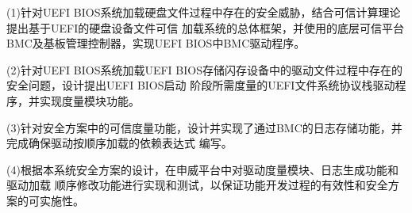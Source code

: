 \begin{cabstract}
\par (1)针对UEFI BIOS系统加载硬盘文件过程中存在的安全威胁，结合可信计算理论提出基于UEFI的硬盘设备文件可信
加载系统的总体框架，并使用的底层可信平台BMC及基板管理控制器，实现UEFI BIOS中BMC驱动程序。
\par (2)针对UEFI BIOS系统加载UEFI BIOS存储闪存设备中的驱动文件过程中存在的安全问题，设计提出UEFI BIOS启动
阶段所需度量的UEFI文件系统协议栈驱动程序，并实现度量模块功能。
\par (3)针对安全方案中的可信度量功能，设计并实现了通过BMC的日志存储功能，并完成确保驱动按顺序加载的依赖表达式
编写。
\par (4)根据本系统安全方案的设计，在申威平台中对驱动度量模块、日志生成功能和驱动加载
顺序修改功能进行实现和测试，以保证功能开发过程的有效性和安全方案的可实施性。

\end{cabstract}


